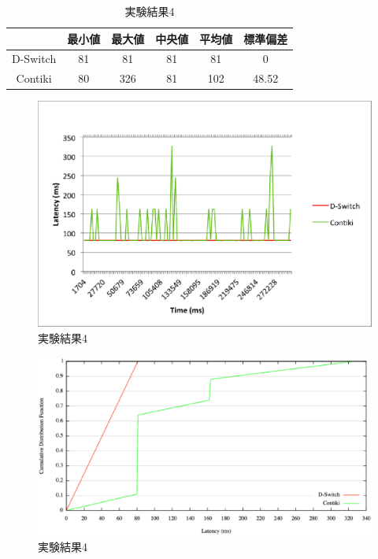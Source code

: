 \begin{table}[htb]
  \centering
  \caption{実験結果4}
  \begin{tabular}{|c||c|c|c|c|c|} \hline
    \backslashbox{}{} & 最小値 & 最大値 & 中央値 & 平均値 & 標準偏差 \\ \hline \hline
    D-Switch & 81 & 81 & 81 & 81 & 0 \\ \hline
    Contiki & 80 & 326 & 81 & 102 & 48.52 \\ \hline
  \end{tabular}
  \label{tab:latency4}
\end{table}

\begin{figure}[htbp]
 \begin{center}
  \includegraphics[width=120mm]{./images/latency4.eps}
 \end{center}
 \caption{実験結果4}
 \label{fig:latency4}
\end{figure}

\begin{figure}[htbp]
 \begin{center}
  \includegraphics[width=120mm]{./images/cdf4.eps}
 \end{center}
 \caption{実験結果4}
 \label{fig:cdf4}
\end{figure}



